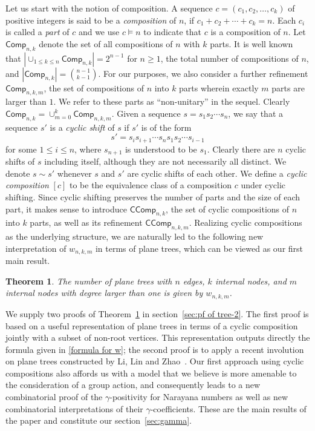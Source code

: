 \documentclass[reqno]{amsart}
\numberwithin{equation}{section}
\newtheorem{theorem}{Theorem}[section]
\theoremstyle{definition}
\theoremstyle{named}
\newcommand{\abs}[1]{\left|#1\right|}
\def\Comp{\mathsf{Comp}}
\def\CComp{\mathsf{CComp}}
\begin{document}
Let us start with the notion of composition. A sequence $c=(c_1,c_2,\ldots,c_k)$ of positive integers is said to be a {\it composition} of $n$, if $c_1+c_2+\cdots+c_k=n$. Each $c_i$ is called a {\it part} of $c$ and we use $c\vDash n$ to indicate that $c$ is a composition of $n$. Let $\Comp_{n,k}$ denote the set of all compositions of $n$ with $k$ parts. It is well known that $\abs{\cup_{1\le k\le n}\Comp_{n,k}}=2^{n-1}$ for $n\ge 1$, the total number of compositions of $n$, and $\abs{\Comp_{n,k}}=\binom{n-1}{k-1}$. For our purposes, we also consider a further refinement $\Comp_{n,k,m}$, the set of compositions of $n$ into $k$ parts wherein exactly $m$ parts are larger than $1$. We refer to these parts as ``non-unitary'' in the sequel. Clearly $\Comp_{n,k}=\cup_{m=0}^k\Comp_{n,k,m}$. Given a sequence $s=s_1s_2\cdots s_n$, we say that a sequence $s'$ is a {\it cyclic shift} of $s$ if $s'$ is of the form
$$s'=s_is_{i+1}\cdots s_ns_1s_2\cdots s_{i-1}$$
for some $1\le i\le n$, where $s_{n+1}$ is understood to be $s_1$. Clearly there are $n$ cyclic shifts of $s$ including itself, although they are not necessarily all distinct. We denote $s\sim s'$ whenever $s$ and $s'$ are cyclic shifts of each other. We define a {\it cyclic composition} $[c]$ to be the equivalence class of a composition $c$ under cyclic shifting. Since cyclic shifting preserves the number of parts and the size of each part, it makes sense to introduce $\CComp_{n,k}$, the set of cyclic compositions of $n$ into $k$ parts, as well as its refinement $\CComp_{n,k,m}$. Realizing cyclic compositions as the underlying structure, we are naturally led to the following new interpretation of $w_{n,k,m}$ in terms of plane trees, which can be viewed as our first main result.
\begin{theorem}\label{thm:tree-2}
The number of plane trees with $n$ edges, $k$ internal nodes, and $m$ internal nodes with degree larger than one is given by $w_{n,k,m}$.
\end{theorem}

We supply two proofs of Theorem~\ref{thm:tree-2} in section~\ref{sec:pf of tree-2}. The first proof is based on a useful representation of plane trees in terms of a cyclic composition jointly with a subset of non-root vertices. This representation outputs directly the formula given in \eqref{formula for w}; the second proof is to apply a recent involution on plane trees constructed by Li, Lin and Zhao~\cite{LLZ2024}. Our first approach using cyclic compositions also affords us with a model that we believe is more amenable to the consideration of a group action, and consequently leads to a new combinatorial proof of the $\gamma$-positivity for Narayana numbers as well as new combinatorial interpretations of their $\gamma$-coefficients. These are the main results of the paper and constitute our section~\ref{sec:gamma}. 
\end{document}
